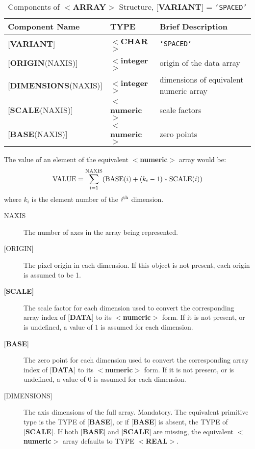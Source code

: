 \documentclass[twoside,11pt]{article}
\renewcommand{\_}{\texttt{\symbol{95}}}
\begin{document}
\begin{table}[htb]
\centering
\caption{Components of $<${\bf ARRAY}$>$ Structure,
{[}{\bf VARIANT}{]} = {\tt `SPACED'}}
\begin{tabular}{|l|l|l|}
\hline
Component Name & TYPE & Brief Description \\  \hline
{[}{\bf VARIANT}{]} & $<${\bf \_CHAR}$>$ & {\tt `SPACED'} \\
{[}{\bf ORIGIN}(NAXIS){]} & $<${\bf integer}$>$ & origin of the data array \\
{[}{\bf DIMENSIONS}(NAXIS){]} & $<${\bf integer}$>$ & dimensions of equivalent numeric array\\
{[}{\bf SCALE}(NAXIS){]} & $<${\bf numeric}$>$ & scale factors \\
{[}{\bf BASE}(NAXIS){]} & $<${\bf numeric}$>$ & zero points \\ \hline
\end{tabular}
\end{table}

The value of an element of the equivalent
$<${\bf numeric}$>$ array would be:
\[{\rm VALUE} = \sum_{i=1}^{\rm NAXIS} ({\rm BASE}(i) + (k_i-1) * {\rm SCALE}(i) ) \]
where $k_i$ is the element number of the $i^{\rm th}$ dimension.
\begin{description}
\item [NAXIS]
The number of axes in the array being represented.
\item [{[}ORIGIN{]}]
The pixel origin in each dimension.  If this object is not present,
each origin is assumed to be 1.
\item [{[}{\bf SCALE}{]}]
The scale factor for each dimension used to convert the corresponding
array index of {[}{\bf DATA}{]} to its
$<${\bf numeric}$>$ form.  If it is not present, or is undefined,
a value of 1 is assumed for each dimension.
\item [{[}{\bf BASE}{]}]
The zero point for each dimension used to convert the corresponding
array index of {[}{\bf DATA}{]} to its
$<${\bf numeric}$>$ form.  If it is not present, or is undefined, a value of 0
is assumed for each dimension.
\item [{[}DIMENSIONS{]}]
The axis dimensions of the full array.  Mandatory.
The equivalent primitive type
is the TYPE of {[}{\bf BASE}{]}, or if {[}{\bf BASE}{]} is
absent, the TYPE of {[}{\bf SCALE}{]}.  If both
{[}{\bf BASE}{]} and {[}{\bf SCALE}{]} are missing, the
equivalent $<${\bf numeric}$>$ array defaults to
TYPE $<${\bf \_REAL}$>$.
\end{description}
\end{document}
